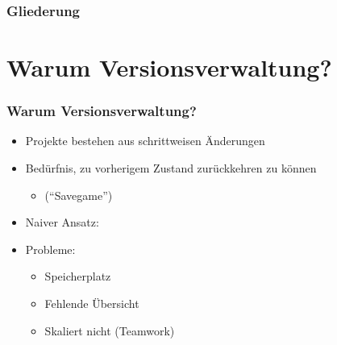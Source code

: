 \documentclass{beamer}
\begin{document}
\begin{frame}[label=wb2]

\begin{center}
 \vspace{10mm}
\end{center}

\end{frame}


\begin{frame}[label=ol1]
  \frametitle{Gliederung}
  \tableofcontents
\end{frame}

\section{Warum Versionsverwaltung?}

\begin{frame}[label=why10]
\frametitle{Warum Versionsverwaltung?}

\begin{itemize}
  \item Projekte bestehen aus schrittweisen Änderungen
  \item Bedürfnis, zu vorherigem Zustand zurückkehren zu können

  \begin{itemize}
\item  ("`Savegame"')
    \end{itemize}

  \item Naiver Ansatz: \hspace{10mm}

  \item Probleme:
  \begin{itemize}
   \item Speicherplatz
   \item Fehlende Übersicht
   \item Skaliert nicht (Teamwork)
  \end{itemize}

  \end{itemize}
\end{frame}
\end{document}
